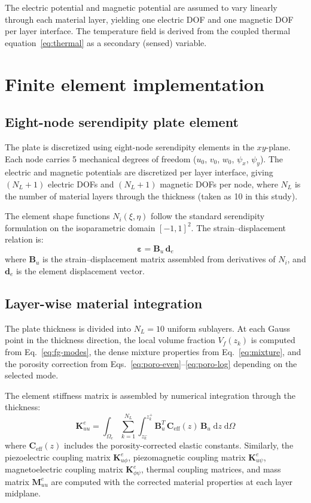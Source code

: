 \documentclass[11pt,a4paper]{article}
\newcommand{\dd}{\mathrm{d}}
\newcommand{\beps}{\bm{\varepsilon}}
\begin{document}
The electric potential and magnetic potential are assumed to vary linearly through each material layer, yielding one electric DOF and one magnetic DOF per layer interface. The temperature field is derived from the coupled thermal equation~\eqref{eq:thermal} as a secondary (sensed) variable.

\section{Finite element implementation}

\subsection{Eight-node serendipity plate element}

The plate is discretized using eight-node serendipity elements in the $xy$-plane. Each node carries 5 mechanical degrees of freedom ($u_0$, $v_0$, $w_0$, $\psi_x$, $\psi_y$). The electric and magnetic potentials are discretized per layer interface, giving $(N_L + 1)$ electric DOFs and $(N_L + 1)$ magnetic DOFs per node, where $N_L$ is the number of material layers through the thickness (taken as 10 in this study).

The element shape functions $N_i(\xi,\eta)$ follow the standard serendipity formulation on the isoparametric domain $[-1,1]^2$. The strain--displacement relation is:
\begin{equation}
\beps = \bm{B}_u\,\bm{d}_e
\end{equation}
where $\bm{B}_u$ is the strain--displacement matrix assembled from derivatives of $N_i$, and $\bm{d}_e$ is the element displacement vector.

\subsection{Layer-wise material integration}

The plate thickness is divided into $N_L = 10$ uniform sublayers. At each Gauss point in the thickness direction, the local volume fraction $V_f(z_k)$ is computed from Eq.~\eqref{eq:fg-modes}, the dense mixture properties from Eq.~\eqref{eq:mixture}, and the porosity correction from Eqs.~\eqref{eq:poro-even}--\eqref{eq:poro-log} depending on the selected mode.

The element stiffness matrix is assembled by numerical integration through the thickness:
\begin{equation}
\bm{K}_{uu}^e = \int_{\Omega_e}\sum_{k=1}^{N_L}\int_{z_k^-}^{z_k^+} \bm{B}_u^T\,\bm{C}_{\text{eff}}(z)\,\bm{B}_u\;\dd z\;\dd\Omega
\end{equation}
where $\bm{C}_{\text{eff}}(z)$ includes the porosity-corrected elastic constants. Similarly, the piezoelectric coupling matrix $\bm{K}_{u\phi}^e$, piezomagnetic coupling matrix $\bm{K}_{u\psi}^e$, magnetoelectric coupling matrix $\bm{K}_{\phi\psi}^e$, thermal coupling matrices, and mass matrix $\bm{M}_{uu}^e$ are computed with the corrected material properties at each layer midplane.
\end{document}
